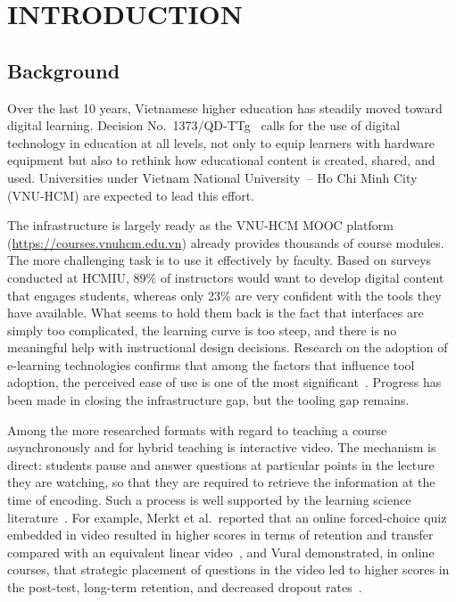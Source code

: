 
\chapter{INTRODUCTION}
\label{ch:intro}
\section{Background}

Over the last 10 years, Vietnamese higher education has steadily moved toward digital learning. Decision No.~1373/QD-TTg~\cite{vietnam_strategy2021} calls for the use of digital technology in education at all levels, not only to equip learners with hardware equipment but also to rethink how educational content is created, shared, and used. Universities under Vietnam National University~-- Ho Chi Minh City (VNU-HCM) are expected to lead this effort.

The infrastructure is largely ready as the VNU-HCM MOOC platform~\cite{vnuhcm_mooc} (\url{https://courses.vnuhcm.edu.vn}) already provides thousands of course modules. The more challenging task is to use it effectively by faculty. Based on surveys conducted at HCMIU, 89\% of instructors would want to develop digital content that engages students, whereas only 23\% are very confident with the tools they have available. What seems to hold them back is the fact that interfaces are simply too complicated, the learning curve is too steep, and there is no meaningful help with instructional design decisions. Research on the adoption of e-learning technologies confirms that among the factors that influence tool adoption, the perceived ease of use is one of the most significant~\cite{hadullo2017}. Progress has been made in closing the infrastructure gap, but the tooling gap remains.

Among the more researched formats with regard to teaching a course asynchronously and for hybrid teaching is interactive video. The mechanism is direct: students pause and answer questions at particular points in the lecture they are watching, so that they are required to retrieve the information at the time of encoding. Such a process is well supported by the learning science literature~\cite{freeman2014}. For example, Merkt et al.\ reported that an online forced-choice quiz embedded in video resulted in higher scores in terms of retention and transfer compared with an equivalent linear video~\cite{merkt2011}, and Vural demonstrated, in online courses, that strategic placement of questions in the video led to higher scores in the post-test, long-term retention, and decreased dropout rates~\cite{vural2013}.

